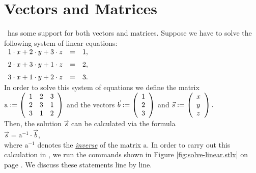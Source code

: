 \section{Vectors and Matrices}
\setlx\ has some support for both vectors and matrices.  Suppose we have to solve the following system
of linear equations:
\\[0.2cm]
\hspace*{1.3cm}
$\begin{array}[c]{lcl}
    1 \cdot x + 2 \cdot y + 3 \cdot z & = & 1, \\[0.2cm]
    2 \cdot x + 3 \cdot y + 1 \cdot z & = & 2, \\[0.2cm]
    3 \cdot x + 1 \cdot y + 2 \cdot z & = & 3.          
  \end{array}
$
\\[0.2cm]
In order to solve this system of equations we define the matrix
\\[0.2cm]
\hspace*{1.3cm}
$\mathrm{a} := \left(
  \begin{array}[c]{lll}
    1 & 2 & 3     \\
    2 & 3 & 1     \\
    3 & 1 & 2            
  \end{array}\right)
$ \qquad and the vectors \qquad
$\vec{b} := \left(
  \begin{array}[c]{l}
    1 \\
    2 \\
    3        
  \end{array}\right)
$
\quad and \quad
$\vec{s} := \left(
  \begin{array}[c]{l}
    x \\
    y \\
    z        
  \end{array}\right).
$ 
\\[0.2cm]
Then, the solution $\vec{s}$ can be calculated via the formula
\\[0.2cm]
\hspace*{1.3cm}
$\vec{s} = \mathrm{a}^{-1} \cdot \vec{b}$,
\\[0.2cm]
where $\mathrm{a}^{-1}$ denotes the \href{http://en.wikipedia.org/wiki/Invertible_matrix}{\emph{inverse}} of
the matrix $\mathrm{a}$.  In order to carry out this calculation in 
\setlx, we run the commands shown in Figure \ref{fig:solve-linear.stlx} on page
\pageref{fig:solve-linear.stlx}.  We discuss these statements line by line.

